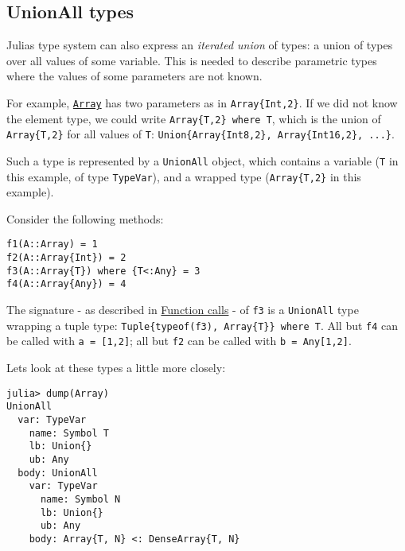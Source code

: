 \hypertarget{11911810306869937851}{}


\subsection{UnionAll types}



Julia{\textquotesingle}s type system can also express an \emph{iterated union} of types: a union of types over all values of some variable. This is needed to describe parametric types where the values of some parameters are not known.



For example, \hyperlink{15492651498431872487}{\texttt{Array}} has two parameters as in \texttt{Array\{Int,2\}}. If we did not know the element type, we could write \texttt{Array\{T,2\} where T}, which is the union of \texttt{Array\{T,2\}} for all values of \texttt{T}: \texttt{Union\{Array\{Int8,2\}, Array\{Int16,2\}, ...\}}.



Such a type is represented by a \texttt{UnionAll} object, which contains a variable (\texttt{T} in this example, of type \texttt{TypeVar}), and a wrapped type (\texttt{Array\{T,2\}} in this example).



Consider the following methods:




\begin{verbatim}
f1(A::Array) = 1
f2(A::Array{Int}) = 2
f3(A::Array{T}) where {T<:Any} = 3
f4(A::Array{Any}) = 4
\end{verbatim}



The signature - as described in \hyperlink{10803679173955542527}{Function calls} - of \texttt{f3} is a \texttt{UnionAll} type wrapping a tuple type: \texttt{Tuple\{typeof(f3), Array\{T\}\} where T}. All but \texttt{f4} can be called with \texttt{a = [1,2]}; all but \texttt{f2} can be called with \texttt{b = Any[1,2]}.



Let{\textquotesingle}s look at these types a little more closely:




\begin{verbatim}
julia> dump(Array)
UnionAll
  var: TypeVar
    name: Symbol T
    lb: Union{}
    ub: Any
  body: UnionAll
    var: TypeVar
      name: Symbol N
      lb: Union{}
      ub: Any
    body: Array{T, N} <: DenseArray{T, N}
\end{verbatim}



